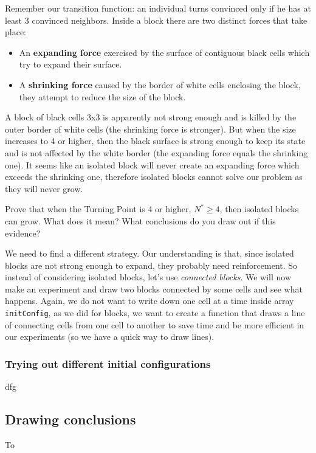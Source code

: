 Remember our transition function:
an individual turns convinced only if he has at least 3 convinced neighbors.
Inside a block there are two distinct forces that take place:

\begin{itemize}
\item An \textbf{expanding force} exercised by the surface of contiguous black cells which
try to expand their surface.
\item A \textbf{shrinking force} caused by the border of white cells enclosing the block, they
attempt to reduce the size of the block.
\end{itemize}

A block of
black cells 3x3 is apparently not strong enough and is killed by the outer border of white cells
(the shrinking force is stronger).
But when the size increases to 4 or higher, then the black surface is strong enough to keep its state
and is not affected by the white border (the expanding force equals the shrinking one).
It seems like an isolated block will never create an expanding force which exceeds the shrinking one,
therefore isolated blocks cannot solve our problem as they will never grow.

\begin{problem}
\label{prob:highernblockslive}
Prove that when the Turning Point is 4 or higher, $N^\ast \geq 4$, then isolated blocks can grow.
What does it mean? What conclusions do you draw out if this evidence?
\end{problem}

We need to find a different strategy. Our understanding is that, since isolated blocks are not
strong enough to expand, they probably need reinforcement. So instead of considering isolated
blocks, let's use \textit{connected blocks}. We will now make an experiment and draw two blocks
connected by some cells and see what happens. Again, we do not want to write down one cell at a time
inside array \texttt{initConfig}, as we did for blocks, we want to create a function that
draws a line of connecting cells from one cell to another to save time and be more efficient
in our experiments (so we have a quick way to draw lines).

\subsubsection{Trying out different initial configurations}
dfg

\subsection{Drawing conclusions}
To
